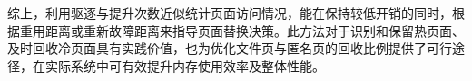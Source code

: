 综上，利用驱逐与提升次数近似统计页面访问情况，能在保持较低开销的同时，根据重用距离或重新故障距离来指导页面替换决策。此方法对于识别和保留热页面、及时回收冷页面具有实践价值，也为优化文件页与匿名页的回收比例提供了可行途径，在实际系统中可有效提升内存使用效率及整体性能。













